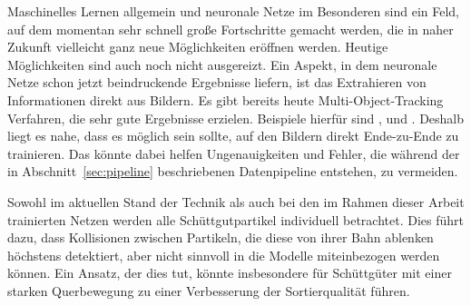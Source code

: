 Maschinelles Lernen allgemein und neuronale Netze im Besonderen sind ein Feld, auf dem momentan sehr schnell große Fortschritte gemacht werden,
die in naher Zukunft vielleicht ganz neue Möglichkeiten eröffnen werden.
Heutige Möglichkeiten sind auch noch nicht ausgereizt.
Ein Aspekt, in dem neuronale Netze schon jetzt beindruckende Ergebnisse liefern, ist das Extrahieren von Informationen direkt aus Bildern.
Es gibt bereits heute Multi-Object-Tracking Verfahren, die sehr gute Ergebnisse erzielen. 
Beispiele hierfür sind \cite{Milan2017}, \cite{son2017multi} und \cite{ning2017spatially}.
Deshalb liegt es nahe, dass es möglich sein sollte, auf den Bildern direkt Ende-zu-Ende zu trainieren.
Das könnte dabei helfen Ungenauigkeiten und Fehler, die während der in Abschnitt~\ref{sec:pipeline} beschriebenen Datenpipeline entstehen, zu vermeiden.

Sowohl im aktuellen Stand der Technik als auch bei den im Rahmen dieser Arbeit trainierten Netzen werden alle Schüttgutpartikel individuell betrachtet.
Dies führt dazu, dass Kollisionen zwischen Partikeln, die diese von ihrer Bahn ablenken höchstens detektiert, aber nicht sinnvoll in die Modelle miteinbezogen werden können.
Ein Ansatz, der dies tut, könnte insbesondere für Schüttgüter mit einer starken Querbewegung zu einer Verbesserung der Sortierqualität führen.



